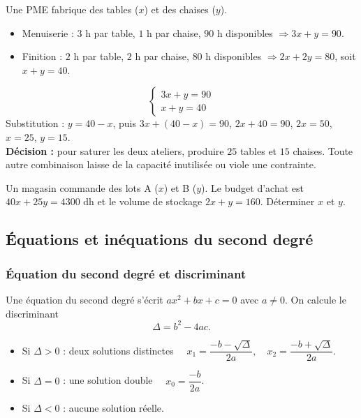 \documentclass[12pt,a4paper]{article}
\begin{document}
\begin{exemplebox}
Une PME fabrique des tables ($x$) et des chaises ($y$).
\begin{itemize}[leftmargin=1.2cm]
  \item Menuiserie : $3$ h par table, $1$ h par chaise, $90$ h disponibles $\Rightarrow 3x+y=90$.
  \item Finition : $2$ h par table, $2$ h par chaise, $80$ h disponibles $\Rightarrow 2x+2y=80$, soit $x+y=40$.
\end{itemize}
$$\begin{cases} 3x+y = 90 \\ x+y = 40 \end{cases}$$
Substitution : $y=40-x$, puis $3x+(40-x)=90$, $2x+40=90$, $2x=50$, $x=25$, $y=15$.\\
\textbf{Décision :} pour saturer les deux ateliers, produire $25$ tables et $15$ chaises. Toute autre combinaison laisse de la capacité inutilisée ou viole une contrainte.
\end{exemplebox}

\begin{exobox}
Un magasin commande des lots A ($x$) et B ($y$). Le budget d'achat est $40x+25y=4300$ dh et le volume de stockage $2x+y=160$. Déterminer $x$ et $y$.
\end{exobox}

\subsection{Équations et inéquations du second degré}

\subsubsection{Équation du second degré et discriminant}

\begin{definitionbox}
Une équation du second degré s'écrit $ax^2+bx+c=0$ avec $a\neq 0$. On calcule le discriminant
$$\Delta = b^2 - 4ac.$$
\end{definitionbox}

\begin{propbox}
\begin{itemize}[leftmargin=1.2cm]
  \item Si $\Delta > 0$ : deux solutions distinctes $\quad x_1=\dfrac{-b-\sqrt{\Delta}}{2a}, \quad x_2=\dfrac{-b+\sqrt{\Delta}}{2a}$.
  \item Si $\Delta = 0$ : une solution double $\quad x_0 = \dfrac{-b}{2a}$.
  \item Si $\Delta < 0$ : aucune solution réelle.
\end{itemize}
\end{propbox}
\end{document}
